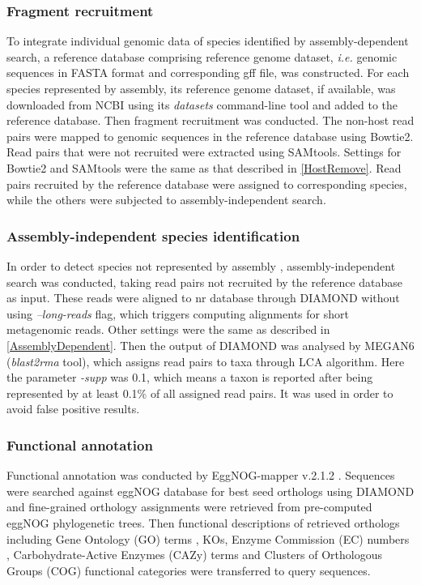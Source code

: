\documentclass[11pt]{article}
\begin{document}
    \subsubsection{Fragment recruitment}
    To integrate individual genomic data of species identified by assembly-dependent search, a reference database comprising reference genome dataset, \textit{i.e.} genomic sequences in FASTA format and corresponding gff file, was constructed. 
    For each species represented by assembly, its reference genome dataset, if available, was downloaded from NCBI using its \textit{datasets} command-line tool and added to the reference database. 
    \newline
    Then fragment recruitment was conducted. 
    The non-host read pairs were mapped to genomic sequences in the reference database using Bowtie2. 
    Read pairs that were not recruited were extracted using SAMtools. 
    Settings for Bowtie2 and SAMtools were the same as that described in \ref{HostRemove}. 
    Read pairs recruited by the reference database were assigned to corresponding species, while the others were subjected to assembly-independent search.

    \subsubsection{Assembly-independent species identification}
    In order to detect species not represented by assembly \citep{sharon2015accurate,vollmers2017comparing}, assembly-independent search was conducted, taking read pairs not recruited by the reference database as input. 
    These reads were aligned to nr database through DIAMOND without using \textit{--long-reads} flag, which triggers computing alignments for short metagenomic reads. 
    Other settings were the same as described in \ref{AssemblyDependent}. 
    Then the output of DIAMOND was analysed by MEGAN6 (\textit{blast2rma} tool), which assigns read pairs to taxa through LCA algorithm. 
    Here the parameter \textit{-supp} was 0.1, which means a taxon is reported after being represented by at least 0.1\% of all assigned read pairs. 
    It was used in order to avoid false positive results. 

    \subsubsection{Functional annotation}
    Functional annotation was conducted by EggNOG-mapper v.2.1.2 \citep{huerta2017fast}. 
    Sequences were searched against eggNOG database \citep{huerta2019eggnog} for best seed orthologs using DIAMOND and fine-grained orthology assignments were retrieved from pre-computed eggNOG phylogenetic trees. 
    Then functional descriptions of retrieved orthologs including Gene Ontology (GO) terms \citep{gene2004gene}, KOs, Enzyme Commission (EC) numbers \citep{webb1992enzyme}, Carbohydrate-Active Enzymes (CAZy) terms \citep{cantarel2009carbohydrate} and Clusters of Orthologous Groups (COG) functional categories \citep{tatusov2000cog} were transferred to query sequences.
\end{document}
